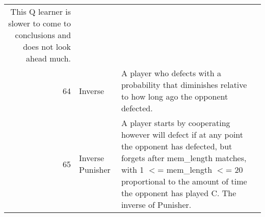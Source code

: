\begin{table}[H]
\begin{adjustbox}{height=0.8\textwidth, width=1.1\textwidth}
\begin{tabular}{rlll}
	This Q learner is slower to come to conclusions and does not look ahead much.                                                                                                                                                                                                                                                                                                                                                                                                                                                                                                                                                                                                                                                                                                                                                                                                                                                             \\
	64   & Inverse                     & A player who defects with a probability that diminishes relative to how
	long ago the opponent defected.                                                                                                                                                                                                                                                                                                                                                                                                                                                                                                                                                                                                                                                                                                                                                                                                                                                                                                              \\
	65   & Inverse Punisher            & A player starts by cooperating however will defect if at any point the
	opponent has defected, but forgets after mem\_length matches, with
	1 \ensuremath{<}= mem\_length \ensuremath{<}= 20 proportional to the amount of time the opponent
	has played C. The inverse of Punisher.                                                                                                                                                                                                                                                                                                                                                                                                                                                                                                                                                                                                                                                                                                                                                        \\

\end{tabular}
\end{adjustbox}
\end{table}
